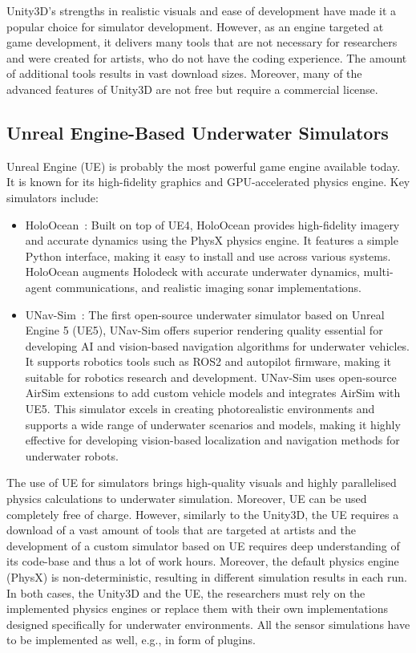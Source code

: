 Unity3D's strengths in realistic visuals and ease of development have made it a popular choice for simulator development. However, as an engine targeted at game development, it delivers many tools that are not necessary for researchers and were created for artists, who do not have the coding experience. The amount of additional tools results in vast download sizes. Moreover, many of the advanced features of Unity3D are not free but require a commercial license.



\subsection{Unreal Engine-Based Underwater Simulators}

Unreal Engine (UE) is probably the most powerful game engine available today. It is known for its high-fidelity graphics and GPU-accelerated physics engine. Key simulators include:

\begin{itemize}
\item HoloOcean~\cite{potokar2022holoocean}: Built on top of UE4, HoloOcean provides high-fidelity imagery and accurate dynamics using the PhysX physics engine. It features a simple Python interface, making it easy to install and use across various systems. HoloOcean augments Holodeck with accurate underwater dynamics, multi-agent communications, and realistic imaging sonar implementations. 

\item UNav-Sim~\cite{amer2023unav}: The first open-source underwater simulator based on Unreal Engine 5 (UE5), UNav-Sim offers superior rendering quality essential for developing AI and vision-based navigation algorithms for underwater vehicles. It supports robotics tools such as ROS2 and autopilot firmware, making it suitable for robotics research and development. UNav-Sim uses open-source AirSim \cite{AirSim} extensions to add custom vehicle models and integrates AirSim with UE5. This simulator excels in creating photorealistic environments and supports a wide range of underwater scenarios and models, making it highly effective for developing vision-based localization and navigation methods for underwater robots.
\end{itemize}

The use of UE for simulators brings high-quality visuals and highly parallelised physics calculations to underwater simulation. Moreover, UE can be used completely free of charge.
%
However, similarly to the Unity3D, the UE requires a download of a vast amount of tools that are targeted at artists and the development of a custom simulator based on UE requires deep understanding of its code-base and thus a lot of work hours. Moreover, the default physics engine (PhysX) is non-deterministic, resulting in different simulation results in each run.
% 
In both cases, the Unity3D and the UE, the researchers must rely on the implemented physics engines or replace them with their own implementations designed specifically for underwater environments. All the sensor simulations have to be implemented as well, e.g., in form of plugins.




